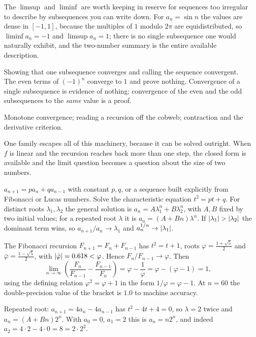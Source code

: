 The $\limsup$ and $\liminf$ are worth keeping in reserve for sequences too irregular to describe by subsequences you can write down. For $a_n=\sin n$ the values are dense in $[-1,1]$, because the multiples of $1$ modulo $2\pi$ are equidistributed, so $\liminf a_n=-1$ and $\limsup a_n=1$; there is no single subsequence one would naturally exhibit, and the two-number summary is the entire available description.

\begin{trap}
Showing that one subsequence converges and calling the sequence convergent. The even terms of $(-1)^n$ converge to $1$ and prove nothing. Convergence of a single subsequence is evidence of nothing; convergence of the even and the odd subsequences to the \emph{same} value is a proof.
\end{trap}

\begin{seealsob}Monotone convergence; reading a recursion off the cobweb; contraction and the derivative criterion.\end{seealsob}

One family escapes all of this machinery, because it can be solved outright. When $f$ is linear and the recursion reaches back more than one step, the closed form is available and the limit question becomes a question about the size of two numbers.

\cue $a_{n+1}=pa_n+qa_{n-1}$ with constant $p,q$, or a sequence built explicitly from Fibonacci or Lucas numbers.
\method Solve the characteristic equation $t^2=pt+q$. For distinct roots $\lambda_1,\lambda_2$ the general solution is $a_n=A\lambda_1^n+B\lambda_2^n$, with $A,B$ fixed by two initial values; for a repeated root $\lambda$ it is $a_n=(A+Bn)\lambda^n$. If $\left\lvert \lambda_1\right\rvert>\left\lvert \lambda_2\right\rvert$ the dominant term wins, so $a_{n+1}/a_n\to\lambda_1$ and $a_n^{1/n}\to\left\lvert \lambda_1\right\rvert$.

\begin{worked}
The Fibonacci recursion $F_{n+1}=F_n+F_{n-1}$ has $t^2=t+1$, roots $\varphi=\tfrac{1+\sqrt5}{2}$ and $\bar\varphi=\tfrac{1-\sqrt5}{2}$, with $\left\lvert \bar\varphi\right\rvert=0.618<\varphi$. Hence $F_n/F_{n-1}\to\varphi$. Then
\[\lim_{n\to\infty}\left(\frac{F_n}{F_{n-1}}-\frac{F_{n-1}}{F_n}\right)=\varphi-\frac1\varphi=\varphi-(\varphi-1)=1,\]
using the defining relation $\varphi^2=\varphi+1$ in the form $1/\varphi=\varphi-1$. At $n=60$ the double-precision value of the bracket is $1.0$ to machine accuracy.

Repeated root: $a_{n+1}=4a_n-4a_{n-1}$ has $t^2-4t+4=0$, so $\lambda=2$ twice and $a_n=(A+Bn)2^n$. With $a_0=0$, $a_1=2$ this is $a_n=n2^n$, and indeed $a_2=4\cdot2-4\cdot0=8=2\cdot2^2$.
\end{worked}

